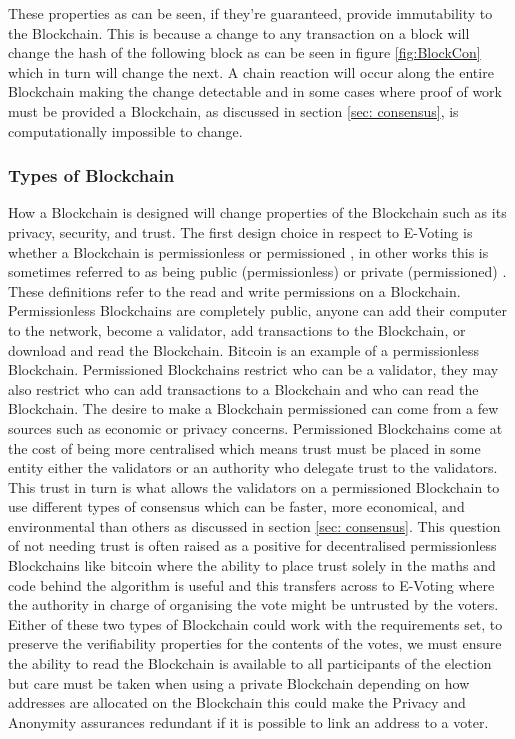 \documentclass{entcs}
\begin{document}
These properties as can be seen, if they're guaranteed, provide immutability to the Blockchain. This is because a change to any transaction on a block will change the hash of the following block as can be seen in figure \ref{fig:BlockCon} which in turn will change the next. A chain reaction will occur along the entire Blockchain making the change detectable and in some cases where proof of work must be provided a Blockchain, as discussed in section \ref{sec: consensus}, is computationally impossible to change.

\subsubsection{Types of Blockchain}
How a Blockchain is designed will change properties of the Blockchain such as its privacy, security, and trust. The first design choice in respect to E-Voting is whether a Blockchain is permissionless or permissioned \cite{wust2018need}, in other works this is sometimes referred to as being public (permissionless) or private (permissioned) \cite{blockchainBeginners}. These definitions refer to the read and write permissions on a Blockchain. 
Permissionless Blockchains are completely public, anyone can add their computer to the network, become a validator, add transactions to the Blockchain, or download and read the Blockchain. Bitcoin is an example of a permissionless Blockchain.
Permissioned Blockchains restrict who can be a validator, they may also restrict who can add transactions to a Blockchain and who can read the Blockchain. 
The desire to make a Blockchain permissioned can come from a few sources such as economic or privacy concerns. Permissioned Blockchains come at the cost of being more centralised which means trust must be placed in some entity either the validators or an authority who delegate trust to the validators. This trust in turn is what allows the validators on a permissioned Blockchain to use different types of consensus which can be faster, more economical, and environmental than others as discussed in section \ref{sec: consensus}.
This question of not needing trust \cite{lemieux2016trusting} is often raised as a positive for decentralised permissionless Blockchains like bitcoin where the ability to place trust solely in the maths and code behind the algorithm is useful and this transfers across to E-Voting where the authority in charge of organising the vote might be untrusted by the voters.
Either of these two types of Blockchain could work with the requirements set, to preserve the verifiability properties for the contents of the votes, we must ensure the ability to read the Blockchain is available to all participants of the election but care must be taken when using a private Blockchain depending on how addresses are allocated on the Blockchain this could make the Privacy and Anonymity assurances redundant if it is possible to link an address to a voter.
\end{document}

